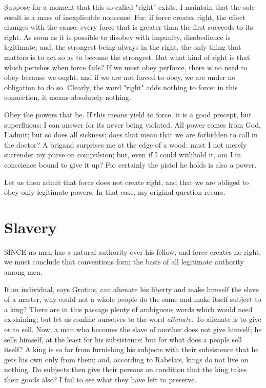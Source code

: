 \documentclass[12pt]{report}
\begin{document}
Suppose for a moment that this so-called "right" exists. I maintain that the sole result is a mass of inexplicable nonsense. For, if force creates right, the effect changes with the cause: every force that is greater than the first succeeds to its right. As soon as it is possible to disobey with impunity, disobedience is legitimate; and, the strongest being always in the right, the only thing that matters is to act so as to become the strongest. But what kind of right is that which perishes when force fails? If we must obey perforce, there is no need to obey because we ought; and if we are not forced to obey, we are under no obligation to do so. Clearly, the word "right" adds nothing to force: in this connection, it means absolutely nothing.

Obey the powers that be. If this means yield to force, it is a good precept, but superfluous: I can answer for its never being violated. All power comes from God, I admit; but so does all sickness: does that mean that we are forbidden to call in the doctor? A brigand surprises me at the edge of a wood: must I not merely surrender my purse on compulsion; but, even if I could withhold it, am I in conscience bound to give it up? For certainly the pistol he holds is also a power.

Let us then admit that force does not create right, and that we are obliged to obey only legitimate powers. In that case, my original question recurs.

\section{Slavery}
SINCE no man has a natural authority over his fellow, and force creates no right, we must conclude that conventions form the basis of all legitimate authority among men.

If an individual, says Grotius, can alienate his liberty and make himself the slave of a master, why could not a whole people do the same and make itself subject to a king? There are in this passage plenty of ambiguous words which would need explaining; but let us confine ourselves to the word \textit{alienate}. To alienate is to give or to sell. Now, a man who becomes the slave of another does not give himself; he sells himself, at the least for his subsistence: but for what does a people sell itself? A king is so far from furnishing his subjects with their subsistence that he gets his own only from them; and, according to Rabelais, kings do not live on nothing. Do subjects then give their persons on condition that the king takes their goods also? I fail to see what they have left to preserve.
\end{document}
